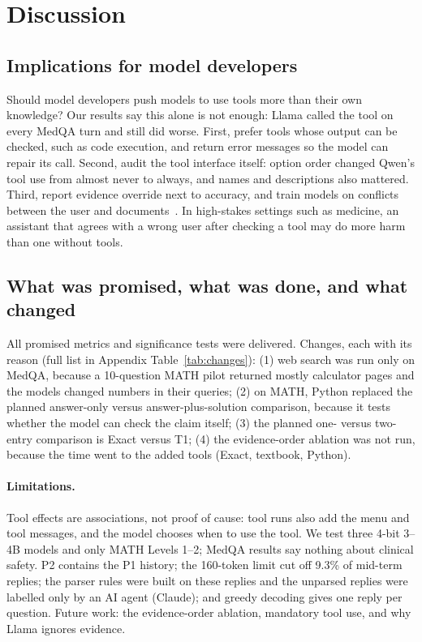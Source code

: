 \section{Discussion}
\label{sec:discussion}

\subsection{Implications for model developers}
\label{sec:implications}
Should model developers push models to use tools more than their own knowledge? Our results say this alone is not enough: Llama called the tool on every MedQA turn and still did worse. First, prefer tools whose output can be checked, such as code execution, and return error messages so the model can repair its call. Second, audit the tool interface itself: option order changed Qwen's tool use from almost never to always, and names and descriptions also mattered. Third, report evidence override next to accuracy, and train models on conflicts between the user and documents~\citep{li2026}. In high-stakes settings such as medicine, an assistant that agrees with a wrong user after checking a tool may do more harm than one without tools.

\subsection{What was promised, what was done, and what changed}
\label{sec:changes}
All promised metrics and significance tests were delivered. Changes, each with its reason (full list in Appendix Table~\ref{tab:changes}): (1) web search was run only on MedQA, because a 10-question MATH pilot returned mostly calculator pages and the models changed numbers in their queries; (2) on MATH, Python replaced the planned answer-only versus answer-plus-solution comparison, because it tests whether the model can check the claim itself; (3) the planned one- versus two-entry comparison is Exact versus T1; (4) the evidence-order ablation was not run, because the time went to the added tools (Exact, textbook, Python).

\paragraph{Limitations.} Tool effects are associations, not proof of cause: tool runs also add the menu and tool messages, and the model chooses when to use the tool. We test three 4-bit 3--4B models and only MATH Levels 1--2; MedQA results say nothing about clinical safety. P2 contains the P1 history; the 160-token limit cut off 9.3\% of mid-term replies; the parser rules were built on these replies and the unparsed replies were labelled only by an AI agent (Claude); and greedy decoding gives one reply per question. Future work: the evidence-order ablation, mandatory tool use, and why Llama ignores evidence.
